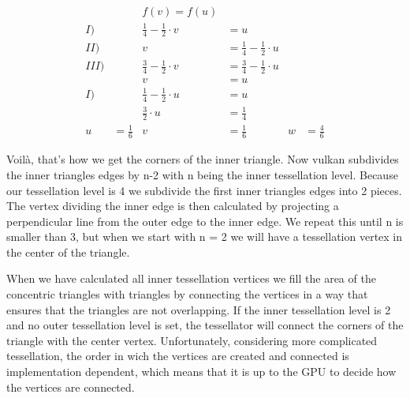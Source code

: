 \documentclass[12pt]{report} \usepackage{preamble}
\begin{document}
\[
	\begin{aligned}
		     &               & f(v)= f(u)                                                                                \\
		I)   &               & \frac{1}{4} - \frac{1}{2}\cdot v & = u                                                    \\
		II)  &               & v                                & = \frac{1}{4} - \frac{1}{2}\cdot u                     \\
		III) &               & \frac{3}{4} -\frac{1}{2}\cdot v  & = \frac{3}{4} -\frac{1}{2}\cdot u                      \\
		     &               & v                                & = u                                                    \\
		I)   &               & \frac{1}{4} - \frac{1}{2}\cdot u & = u                                                    \\
		     &               & \frac{3}{2}\cdot u               & = \frac{1}{4}                                          \\
		u    & = \frac{1}{6} & v                                & = \frac{1}{6}                      & w & = \frac{4}{6}
	\end{aligned}
\]

Voil\`a, that's how we get the corners of the inner triangle.
Now vulkan subdivides the inner triangles edges by n-2 with n being the
inner tessellation level. Because our tessellation level is 4
we subdivide the first inner triangles edges into 2 pieces.
The vertex dividing the inner edge is then calculated by projecting a
perpendicular line from the outer edge to the inner edge.
We repeat this until n is smaller than 3, but when we start with n = 2
we will have a tessellation vertex in the center of the triangle. \cite{tessellation}

When we have calculated all inner tessellation vertices we fill the area of the
concentric triangles with triangles by connecting the vertices in a way that
ensures that the triangles are not overlapping. If the inner tessellation level is 2 and
no outer tessellation level is set, the tessellator will connect the corners
of the triangle with the center vertex. \cite{tessellation}
Unfortunately, considering more complicated tessellation, the order in wich the vertices
are created and connected is implementation dependent,
which means that it is up to the GPU to decide how the vertices are connected. \cite{tessellation}
\end{document}
